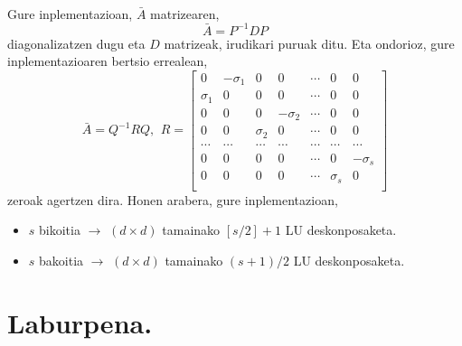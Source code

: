 \paragraph*{}Gure inplementazioan, $\bar{A}$ matrizearen,
\begin{equation*}
\bar{A}=P^{-1}DP
\end{equation*}
diagonalizatzen dugu eta $D$ matrizeak, irudikari puruak ditu. Eta ondorioz, gure inplementazioaren bertsio errealean,
\begin{equation*}
\bar{A}=Q^{-1}RQ, \ \,
R=\begin{bmatrix}
0           & -\sigma_{1}   &  0          &  0            & \cdots &  0           &    0       \\
 \sigma_{1} & 0             & 0           &  0            & \cdots &  0           &    0       \\
 0          & 0             & 0           & -\sigma_{2}   & \cdots &  0           &    0       \\
 0          & 0             & \sigma_{2}  & 0             & \cdots &  0           &    0       \\
 \cdots     & \cdots        &  \cdots     & \cdots        & \cdots & \cdots       &    \cdots   \\
 0          & 0             &  0          & 0             & \cdots & 0            & -\sigma_{s} \\
 0          & 0             &  0          & 0             & \cdots & \sigma_{s}   & 0            \\
\end{bmatrix}
\end{equation*}
zeroak agertzen dira. Honen arabera, gure inplementazioan,
\begin{itemize}
\item $s$ bikoitia $\rightarrow$ $(d \times d)$ tamainako $[s/2]+1$  LU deskonposaketa.
\item $s$ bakoitia $\rightarrow$ $(d \times d)$ tamainako $(s+1)/2$  LU deskonposaketa.
\end{itemize}


\section{Laburpena.}
